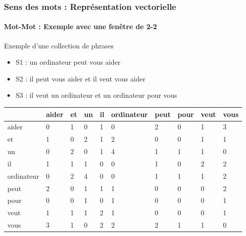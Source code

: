 \documentclass[xcolor=table]{beamer}
\begin{document}
\begin{frame}
\frametitle{Sens des mots : Représentation vectorielle}
\framesubtitle{Mot-Mot : Exemple avec une fenêtre de 2-2}

\begin{exampleblock}{Exemple d'une collection de phrases}
	\begin{itemize}
		\item S1 : un ordinateur peut vous aider
		\item S2 : il peut vous aider et il veut vous aider
		\item S3 : il veut un ordinateur et un ordinateur pour vous
	\end{itemize}
\end{exampleblock}

\begin{center}
	\scriptsize
	\begin{tabular}{llllllllll}
		\hline\hline
		 & aider & et & un & il & ordinateur & peut & pour & veut & vous \\
		 \hline
		aider & 0 & 1 & 0 & 1 & 0 & 2 & 0 & 1 & 3 \\
		et & 1 & 0 & 2 & 1 & 2 & 0 & 0 & 1 & 1 \\
		un & 0 & 2 & 0 & 1 & 4 & 1 & 1 & 1 & 0 \\
		il & 1 & 1 & 1 & 0 & 0 & 1 & 0 & 2 & 2 \\
		ordinateur & 0 & 2 & 4 & 0 & 0 & 1 & 1 & 1 & 2 \\
		peut & 2 & 0 & 1 & 1 & 1 & 0 & 0 & 0 & 2 \\
		pour & 0 & 0 & 1 & 0 & 1 & 0 & 0 & 0 & 1 \\
		veut & 1 & 1 & 1 & 2 & 1 & 0 & 0 & 0 & 1 \\
		vous & 3 & 1 & 0 & 2 & 2 & 2 & 1 & 1 & 0 \\
		\hline\hline
	\end{tabular}
\end{center}

\end{frame}
\end{document}
